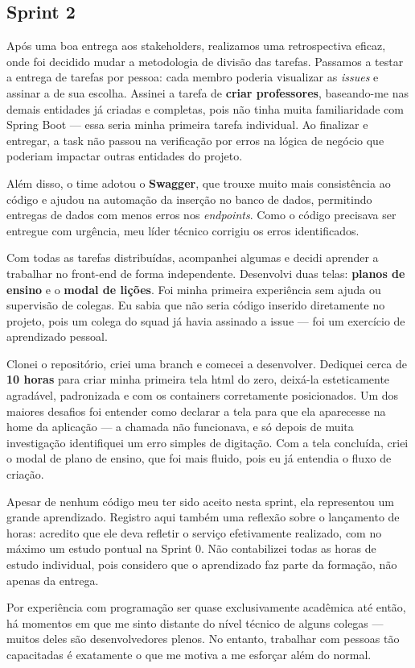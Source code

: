 \subsection{Sprint 2}

Após uma boa entrega aos stakeholders, realizamos uma retrospectiva eficaz, onde foi
decidido mudar a metodologia de divisão das tarefas. Passamos a testar a entrega de
tarefas por pessoa: cada membro poderia visualizar as \textit{issues} e assinar a de
sua escolha. Assinei a tarefa de \textbf{criar professores}, baseando-me nas demais
entidades já criadas e completas, pois não tinha muita familiaridade com Spring Boot
--- essa seria minha primeira tarefa individual. Ao finalizar e entregar, a task não
passou na verificação por erros na lógica de negócio que poderiam impactar outras
entidades do projeto.

Além disso, o time adotou o \textbf{Swagger}, que trouxe muito mais consistência ao
código e ajudou na automação da inserção no banco de dados, permitindo entregas de
dados com menos erros nos \textit{endpoints}. Como o código precisava ser entregue
com urgência, meu líder técnico corrigiu os erros identificados.

Com todas as tarefas distribuídas, acompanhei algumas e decidi aprender a trabalhar no
front-end de forma independente. Desenvolvi duas telas: \textbf{planos de ensino} e o
\textbf{modal de lições}. Foi minha primeira experiência sem ajuda ou supervisão de
colegas. Eu sabia que não seria código inserido diretamente no projeto, pois um colega
do squad já havia assinado a issue --- foi um exercício de aprendizado pessoal.

Clonei o repositório, criei uma branch e comecei a desenvolver. Dediquei cerca de
\textbf{10 horas} para criar minha primeira tela \ac{html} do zero, deixá-la esteticamente
agradável, padronizada e com os containers corretamente posicionados. Um dos maiores
desafios foi entender como declarar a tela para que ela aparecesse na home da aplicação
--- a chamada não funcionava, e só depois de muita investigação identifiquei um erro
simples de digitação. Com a tela concluída, criei o modal de plano de ensino, que foi
mais fluido, pois eu já entendia o fluxo de criação.

Apesar de nenhum código meu ter sido aceito nesta sprint, ela representou um grande
aprendizado. Registro aqui também uma reflexão sobre o lançamento de horas: acredito
que ele deva refletir o serviço efetivamente realizado, com no máximo um estudo
pontual na Sprint 0. Não contabilizei todas as horas de estudo individual, pois
considero que o aprendizado faz parte da formação, não apenas da entrega.

Por experiência com programação ser quase exclusivamente acadêmica até então, há
momentos em que me sinto distante do nível técnico de alguns colegas --- muitos deles
são desenvolvedores plenos. No entanto, trabalhar com pessoas tão capacitadas é
exatamente o que me motiva a me esforçar além do normal.
